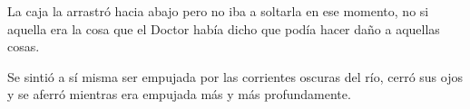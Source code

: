 {La caja la arrastró hacia abajo pero no iba a soltarla en ese momento,
 no si aquella era la cosa que el Doctor había dicho que podía hacer daño
a aquellas cosas.}

{Se sintió a sí misma ser empujada por las corrientes oscuras del río,
 cerró sus ojos y se aferró mientras era empujada más y más
profundamente.}
